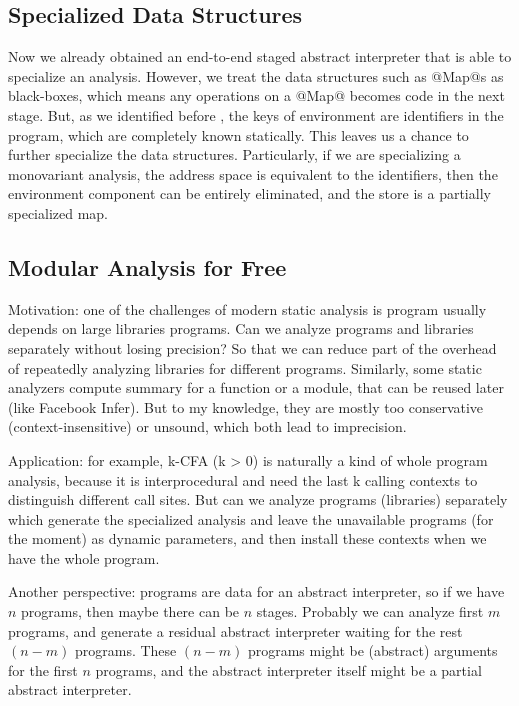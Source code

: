 \subsection{Specialized Data Structures} \label{staged_ds}

Now we already obtained an end-to-end staged abstract interpreter that is able to 
specialize an analysis. However, we treat the data structures such as @Map@s as black-boxes,
which means any operations on a @Map@ becomes code in the next stage.
But, as we identified before , the keys of environment are identifiers in the program,
which are completely known statically. This leaves us a chance to further specialize the 
data structures. Particularly, if we are specializing a monovariant analysis, the address space 
is equivalent to the identifiers, then the environment component can be entirely eliminated, 
and the store is a partially specialized map.

\subsection{Modular Analysis for Free}

Motivation: one of the challenges of modern static analysis is program usually depends on
large libraries programs\cite{toman_et_al:LIPIcs:2017:7121}. 
Can we analyze programs and libraries separately without losing precision? So that we can 
reduce part of the overhead of repeatedly analyzing libraries for different programs.
Similarly, some static analyzers compute summary for a function or a module, that can be reused
later (like Facebook Infer). But to my knowledge, they are mostly too conservative (context-insensitive) 
or unsound, which both lead to imprecision.

Application: for example, k-CFA (k > 0) is naturally a kind of whole program analysis,
because it is interprocedural and need the last k calling contexts to distinguish
different call sites.
But can we analyze programs (libraries) separately which generate the specialized 
analysis and leave the unavailable programs (for the moment) as dynamic parameters, 
and then install these contexts when we have the whole program.

Another perspective: programs are data for an abstract interpreter, so if we have $n$ programs, 
then maybe there can be $n$ stages. 
Probably we can analyze first $m$ programs, and generate a residual abstract interpreter
waiting for the rest $(n-m)$ programs.
These $(n-m)$ programs might be (abstract) arguments for the first $n$ programs, and
the abstract interpreter itself might be a partial abstract interpreter.

